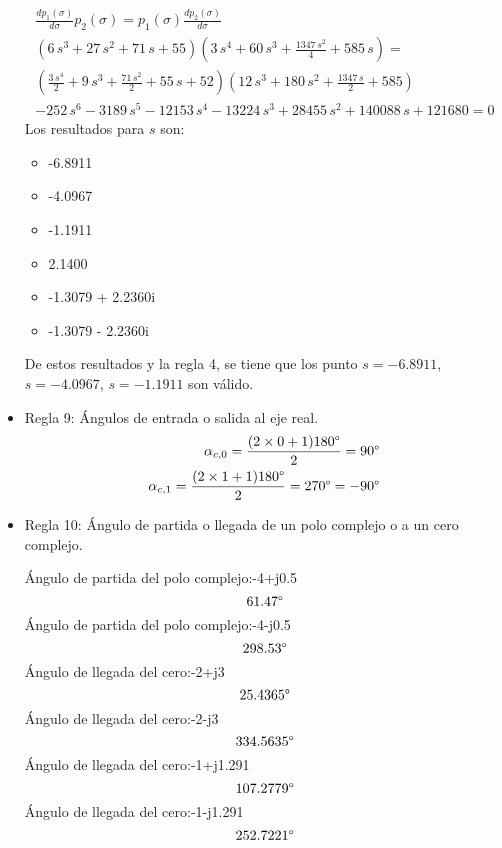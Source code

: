 \begin{itemize}
  \begin{align*}
    \frac{dp_1(\sigma)}{d\sigma} p_2(\sigma) = p_1(\sigma) \frac{dp_2(\sigma)}{d\sigma}
    \\
    (6\,s^3+27\,s^2+71\,s+55)(3\,s^4+60\,s^3+\frac{1347\,s^2}{4}+585\,s) = \\(\frac{3\,s^4}{2}+9\,s^3+\frac{71\,s^2}{2}+55\,s+52)(12\,s^3+180\,s^2+\frac{1347\,s}{2}+585)
    \\
    -252\,s^6-3189\,s^5-12153\,s^4-13224\,s^3+28455\,s^2+140088\,s+121680 = 0
  \end{align*}
  Los resultados para $s$ son:
  \begin{itemize}
    \item -6.8911
    \item -4.0967
    \item -1.1911
    \item 2.1400
    \item -1.3079 + 2.2360i
    \item -1.3079 - 2.2360i
  \end{itemize}
  De estos resultados y la regla 4, se tiene que los punto $s=-6.8911$, $s=-4.0967$, $s=-1.1911$ son válido.
  \item Regla 9: Ángulos de entrada o salida al eje real.
  \begin{align*}
    \alpha_{c,0} = \frac{(2\times0+1)180\degree}{2} = 90\degree
    \\
    \alpha_{c,1} = \frac{(2\times1+1)180\degree}{2} = 270\degree = -90\degree
  \end{align*}
  \item Regla 10: Ángulo de partida o llegada de un polo complejo o a un cero complejo.

  Ángulo de partida del polo complejo:-4+j0.5
  \begin{equation*}
  61.47\degree
  \end{equation*}
  Ángulo de partida del polo complejo:-4-j0.5
  \begin{equation*}
  298.53\degree
  \end{equation*}
  Ángulo de llegada del cero:-2+j3
  \begin{equation*}
  25.4365\degree
  \end{equation*}
  Ángulo de llegada del cero:-2-j3
  \begin{equation*}
  334.5635\degree
  \end{equation*}
  Ángulo de llegada del cero:-1+j1.291
  \begin{equation*}
  107.2779\degree
  \end{equation*}
  Ángulo de llegada del cero:-1-j1.291
  \begin{equation*}
  252.7221\degree
  \end{equation*}


\end{itemize}
